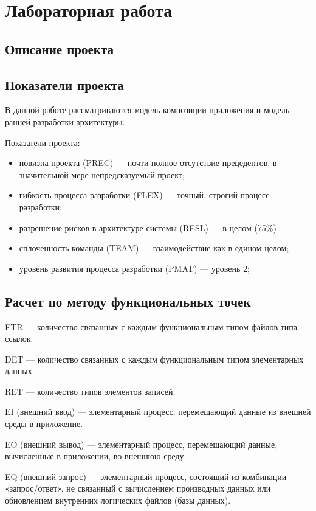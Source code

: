 \chapter{Лабораторная работа}

\section{Описание проекта}

\section{Показатели проекта}

В данной работе рассматриваются модель композиции приложения и модель ранней разработки архитектуры. 

Показатели проекта:
\begin{itemize}[label = ---]
    \item новизна проекта (PREC) --- почти полное отсутствие прецедентов, в значительной мере непредсказуемый проект;
    \item гибкость процесса разработки (FLEX) --- точный, строгий процесс разработки;
    \item разрешение рисков в архитектуре системы (RESL) --- в целом (75\%)
    \item сплоченность команды (TEAM) --- взаимодействие как в едином целом;
    \item уровень развития процесса разработки (PMAT) --- уровень 2;
\end{itemize}

\section{Расчет по методу функциональных точек}

FTR --- количество связанных с каждым функциональным типом файлов типа ссылок.

DET --- количество связанных с каждым функциональным типом элементарных данных.

RET --- количество типов элементов записей.

EI (внешний ввод) --- элементарный процесс, перемещающий данные из внешней среды в приложение.

EO (внешний вывод) --- элементарный процесс, перемещающий данные, вычисленные в приложении, во внешнюю среду.

EQ (внешний запрос) --- элементарный процесс, состоящий из комбинации «запрос/ответ», не связанный с вычислением производных данных или обновлением внутренних логических файлов (базы данных).

